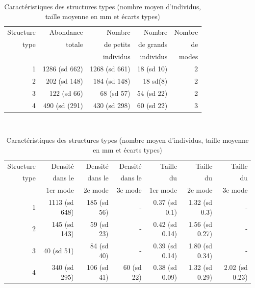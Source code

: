 \begin{table}[!ht]
\centering
\footnotesize
\caption{Caractéristiques des structures types (nombre moyen d'individus, taille
moyenne en mm et écarts types) }\label{tab:SP2}
\begin{tabular}{rrrrr}
  \hline
Structure  & Abondance & Nombre & Nombre & Nombre\\
type & totale & de petits & de grands & de \\
  &  & individus & individus & modes \\
  \hline
  1 & 1286 (sd 662)& 1268 (sd 661)& 18 (sd 10)& 2\\ 
  2 & 202 (sd 148)& 184 (sd 148)& 18 sd(8)& 2\\ 
  3 & 122 (sd 66)& 68 (sd 57)& 54 (sd 22)& 2\\ 
  4 & 490 (sd (291)& 430 (sd 298)& 60 (sd 22)& 3\\ 
   \hline
\end{tabular}
\\[12pt]
\begin{tabular}{rrrrrrr}
  \hline
Structure  & Densité & Densité
& Densité & Taille & Taille & Taille \\
type & dans le & dans le & dans le & du & du & du \\
  & 1er mode &
 2e mode & 3e mode & 1er mode & 2e mode & 3e mode \\
  \hline
1 & 1113 (sd 648)& 185 (sd 56)& - & 0.37 (sd 0.1) & 1.32 (sd 0.3) & - \\ 
  2 & 145 (sd 143)& 59 (sd 23)& - & 0.42 (sd 0.14) & 1.56 (sd 0.27) & - \\ 
  3 & 40 (sd 51) & 84 (sd 40)& - & 0.39 (sd 0.14)& 1.80 (sd 0.34) & - \\ 
  4 & 340 (sd 295)& 106 (sd 41)& 60 (sd 22)& 0.38 (sd 0.09) & 1.32 (sd 0.29) & 2.02
  (sd 0.23)\\
   \hline
\end{tabular}

\end{table}

